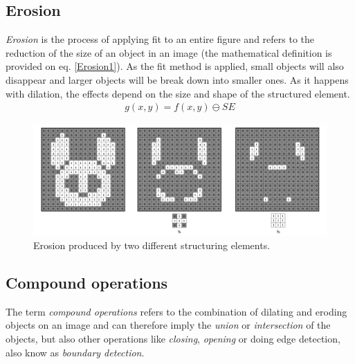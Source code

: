 \subsection{Erosion}
\textit{Erosion} is the process of applying fit to an entire figure and refers to the reduction of the size of an object in an image (the mathematical definition is provided on eq. \ref{Erosion1}). As the fit method is applied, small objects will also disappear and larger objects will be break down into smaller ones. As it happens with dilation, the effects depend on the size and shape of the structured element.
\begin{equation}
\begin{aligned}
{g(x, y)}={f(x,y)}\ominus{SE}
\label{Erosion1}
	\end{aligned}
\end{equation}

\begin{figure}[htbp]
\centering
\includegraphics[width=1\textwidth]{Pictures/Theory/Erosion.png}
\caption{Erosion produced by two different structuring elements.}
\label{fig:Erosion}
\end{figure}

\subsection{Compound operations}
The term \textit{compound operations} refers to the combination of dilating and eroding objects on an image and can therefore imply the \textit{union} or \textit{intersection} of the objects, but also other operations like \textit{closing}, \textit{opening} or doing edge detection, also know as \textit{boundary detection}.
